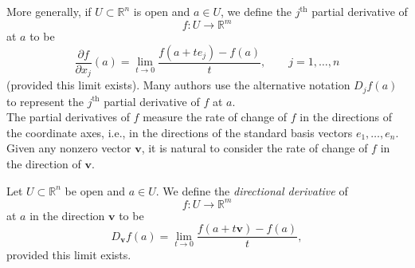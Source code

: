 More generally, if \(U \subset \mathbb{R}^n\) is open and \(a \in U\), we define the \(j^{\text{th}}\) partial derivative of
\[
f : U \to \mathbb{R}^m
\]
at \(a\) to be
\[
\frac{\partial f}{\partial x_j}(a)
=
\lim_{t \to 0}
\frac{f(a + t e_j) - f(a)}{t},
\qquad
j = 1, \ldots, n
\]
(provided this limit exists). Many authors use the alternative notation \(D_j f(a)\) to represent the \(j^{\text{th}}\) partial derivative of \(f\) at \(a\).\\
The partial derivatives of \(f\) measure the rate of change of \(f\) in the directions of the
coordinate axes, i.e., in the directions of the standard basis vectors \(e_1, \ldots, e_n\). Given any
nonzero vector \(\mathbf{v}\), it is natural to consider the rate of change of \(f\) in the direction of \(\mathbf{v}\).
\begin{definition}
Let \(U \subset \mathbb{R}^n\) be open and \(a \in U\). We define the \emph{directional derivative} of
\[
f : U \to \mathbb{R}^m
\]
at \(a\) in the direction \(\mathbf{v}\) to be
\[
D_{\mathbf{v}}f(a)=\lim_{t\to 0}\frac{f(a+t\mathbf{v})-f(a)}{t},
\]
provided this limit exists.
\end{definition}
